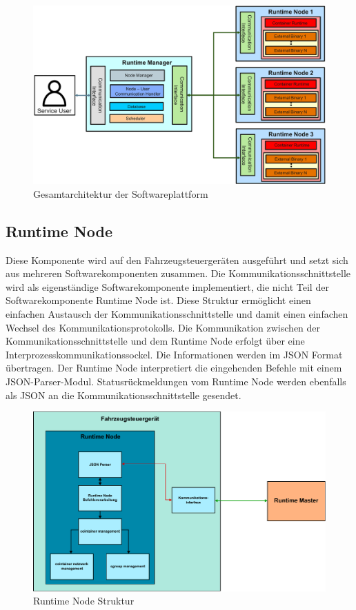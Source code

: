 \begin{figure}[htbp]
	\centering
	\includegraphics[width=\textwidth]{./content/graphics/Architecture.pdf}
	\caption{Gesamtarchitektur der Softwareplattform}
	\label{architektur}
\end{figure}

\subsection{Runtime Node}

Diese Komponente wird auf den Fahrzeugsteuergeräten ausgeführt und setzt sich aus mehreren Softwarekomponenten zusammen. Die Kommunikationsschnittstelle wird als eigenständige Softwarekomponente implementiert, die nicht Teil der Softwarekomponente Runtime Node ist. Diese Struktur ermöglicht einen einfachen Austausch der Kommunikationsschnittstelle und damit einen einfachen Wechsel des Kommunikationsprotokolls. Die Kommunikation zwischen der Kommunikationsschnittstelle und dem Runtime Node erfolgt über eine Interprozesskommunikationssockel. Die Informationen werden im \gls{JSON} Format übertragen. Der Runtime Node interpretiert die eingehenden Befehle mit einem JSON-Parser-Modul. Statusrückmeldungen vom Runtime Node werden ebenfalls als JSON an die Kommunikationsschnittstelle gesendet. 

\begin{figure}[htbp]
	\centering
	\includegraphics[width=\textwidth]{./content/graphics/Runtime_Node_Arch.pdf}
	\caption{Runtime Node Struktur}
	\label{runtime node}
\end{figure}

